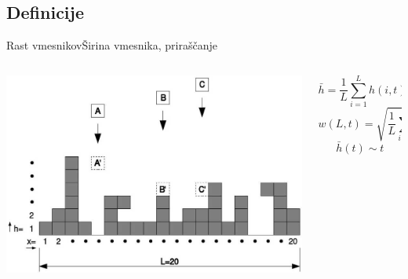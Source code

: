 \documentclass{beamer}
\begin{document}
\subsection{Definicije}

\begin{frame}{Rast vmesnikov}{Širina vmesnika, priraščanje}
\begin{columns}
  \begin{column}{0.45\textwidth}
     \hspace*{-0.05\textwidth}\includegraphics[width=1.1\textwidth]{slike/bdep}
  \end{column}

  \begin{column}{0.55\textwidth}
    \footnotesize
    \begin{equation} \bar{h} = \frac{1}{L} \sum_{i=1}^L h(i,t) \end{equation}
    \newline
    \begin{equation} w(L,t) = \sqrt{\frac{1}{L} \sum_{i=1}^L (h(i,t)-\bar{h}(t))^2} \end{equation}
    \newline
    \begin{equation} \bar{h}(t) \sim t \end{equation}
  \end{column}
\end{columns}
\end{frame}
\end{document}
